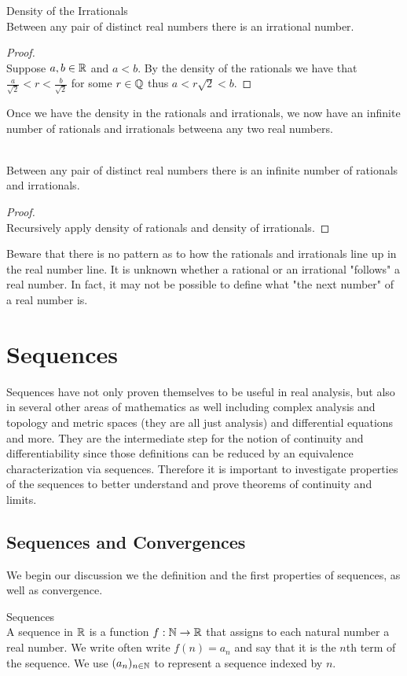 \documentclass[a4paper]{article}
\begin{document}
\begin{thm}{Density of the Irrationals}{}\\ Between any pair of distinct real numbers there is an irrational number. 
\begin{proof}\\ Suppose $a,b\in\mathbb{R}$ and $a<b$. By the density of the rationals we have that $\frac{a}{\sqrt{2}}<r<\frac{b}{\sqrt{2}}$ for some $r\in\mathbb{Q}$ thus $a<r\sqrt{2}<b$. 
\end{proof}
\end{thm}

Once we have the density in the rationals and irrationals, we now have an infinite number of rationals and irrationals betweena any two real numbers. 

\begin{crl}{}{}\\ Between any pair of distinct real numbers there is an infinite number of rationals and irrationals. 
\begin{proof}\\ Recursively apply density of rationals and density of irrationals. 
\end{proof}
\end{crl}

Beware that there is no pattern as to how the rationals and irrationals line up in the real number line. It is unknown whether a rational or an irrational "follows" a real number. In fact, it may not be possible to define what "the next number" of a real number is. 

\pagebreak
\section{Sequences}
Sequences have not only proven themselves to be useful in real analysis, but also in several other areas of mathematics as well including complex analysis and topology and metric spaces (they are all just analysis) and differential equations and more. They are the intermediate step for the notion of continuity and differentiability since those definitions can be reduced by an equivalence characterization via sequences. Therefore it is important to investigate properties of the sequences to better understand and prove theorems of continuity and limits. 

\subsection{Sequences and Convergences}
We begin our discussion we the definition and the first properties of sequences, as well as convergence. 
\begin{defn}{Sequences}{}\\ A sequence in $\mathbb{R}$ is a function $f:\mathbb{N}\to\mathbb{R}$ that assigns to each natural number a real number. We write often write $f(n)=a_n$ and say that it is the $n$th term of the sequence. We use $(a_n)_{n\in\mathbb{N}}$ to represent a sequence indexed by $n$. 
\end{defn}
\end{document}
